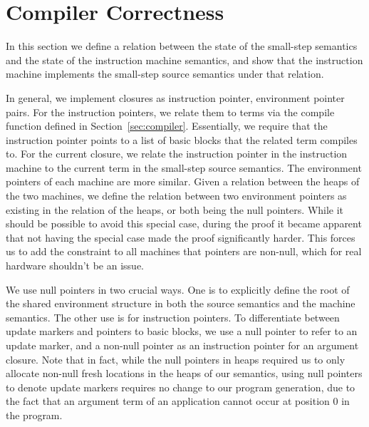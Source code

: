 \section{Compiler Correctness} \label{sec:correctness}

In this section we define a relation between the state of the small-step
semantics and the state of the instruction machine semantics, and show that the
instruction machine implements the small-step source semantics under that
relation. 

In general, we implement closures as instruction pointer, environment pointer
pairs. For the instruction pointers, we relate them to terms via the compile
function defined in Section~\ref{sec:compiler}. Essentially, we require that the
instruction pointer points to a list of basic blocks that the related term
compiles to. For the current closure, we relate the instruction pointer in the
instruction machine to the current term in the small-step source semantics. The
environment pointers of each machine are more similar. Given a relation between
the heaps of the two machines, we define the relation between two environment
pointers as existing in the relation of the heaps, or both being the null
pointers. While it should be possible to avoid this special case, during the
proof it became apparent that not having the special case made the proof
significantly harder. This forces us to add the constraint to all machines that
pointers are non-null, which for real hardware shouldn't be an issue.  

We use null pointers in two crucial ways. One is to explicitly define the root
of the shared environment structure in both the source semantics and the machine
semantics. The other use is for instruction pointers. To differentiate between update
markers and pointers to basic blocks, we use a null pointer to refer to an
update marker, and a non-null pointer as an
instruction pointer for an argument closure. Note that in fact, while the null
pointers in heaps required us to only allocate non-null fresh locations in the
heaps of our semantics, using null pointers to denote update markers requires no
change to our program generation, due to the fact that an argument term of an
application cannot occur at position 0 in the program.


